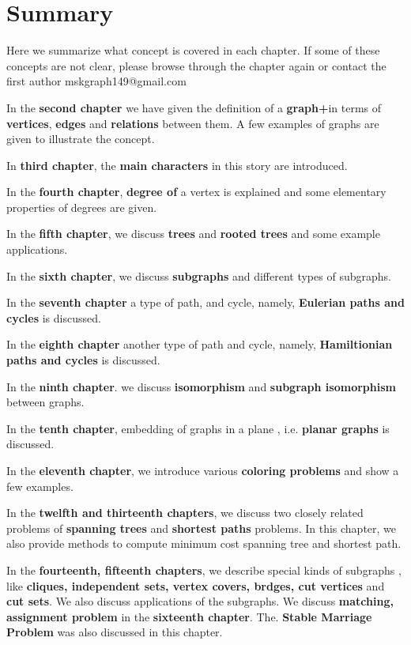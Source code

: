 \chapter{Summary}
Here we summarize what concept is covered in each chapter. If some of these concepts are not clear, please browse through the chapter again or contact the first author mskgraph149@gmail.com

In the \textbf{second chapter} we have given the definition of a \textbf{graph+}in terms of \textbf{vertices}, \textbf{edges} and \textbf{relations} between them. A few examples of graphs are given to illustrate the concept. 

In \textbf{third chapter}, the \textbf{main characters} in this story are introduced.

In the \textbf{fourth chapter}, \textbf{degree of} a vertex is explained and some elementary properties of degrees are given.

In the \textbf{fifth chapter}, we discuss \textbf{trees} and \textbf{rooted trees} and some example applications.

In the \textbf{sixth chapter}, we discuss \textbf{subgraphs} and different types of subgraphs.

In the \textbf{seventh chapter} a type of path, and cycle, namely, \textbf{Eulerian paths and cycles} is discussed.

In the \textbf{eighth chapter} another type of path and cycle, namely, 
\textbf{Hamiltionian paths and cycles} is discussed.

In the \textbf{ninth chapter}. we discuss \textbf{ isomorphism} and \textbf{subgraph isomorphism} between graphs.

In the \textbf{tenth chapter}, embedding of graphs in a plane , i.e. \textbf{planar graphs} is discussed.

In the \textbf{eleventh chapter}, we introduce various \textbf{coloring problems} and show a few examples.

In the \textbf{twelfth and thirteenth chapters}, we discuss two closely related problems of \textbf{spanning trees} and \textbf{shortest paths} problems. In this chapter, we also provide methods to compute minimum cost spanning tree and shortest path.

In the \textbf{fourteenth, fifteenth chapters}, we describe special kinds of subgraphs , like \textbf{cliques, independent sets, vertex covers, brdges, cut vertices} and \textbf{ cut sets}. We also discuss applications of  the subgraphs. We discuss \textbf{matching, assignment problem} in the \textbf{sixteenth chapter}. The. \textbf{Stable Marriage Problem} was also discussed in this chapter.

